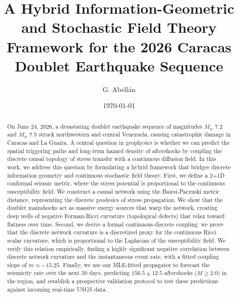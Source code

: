 \documentclass[twocolumn,amsmath,amssymb,aps,pre,superscriptaddress]{revtex4-1}
\begin{document}
\title{A Hybrid Information-Geometric and Stochastic Field Theory Framework for the 2026 Caracas Doublet Earthquake Sequence}

\author{G. Abell\'an}


\date{\today}

\begin{abstract}
On June 24, 2026, a devastating doublet earthquake sequence of magnitudes $M_w$ 7.2 and $M_w$ 7.5 struck northwestern and central Venezuela, causing catastrophic damage in Caracas and La Guaira. A central question in geophysics is whether we can predict the spatial triggering paths and long-term hazard density of aftershocks by coupling the discrete causal topology of stress transfer with a continuous diffusion field. In this work, we address this question by formulating a hybrid framework that bridges discrete information geometry and continuous stochastic field theory. First, we define a 2+1D conformal seismic metric, where the stress potential is proportional to the continuous susceptibility field. We construct a causal network using the Baiesi-Paczuski metric distance, representing the discrete geodesics of stress propagation. We show that the doublet mainshocks act as massive energy sources that warp the network, creating deep wells of negative Forman-Ricci curvature (topological defects) that relax toward flatness over time. Second, we derive a formal continuous-discrete coupling: we prove that the discrete network curvature is a discretized proxy for the continuous Ricci scalar curvature, which is proportional to the Laplacian of the susceptibility field. We verify this relation empirically, finding a highly significant negative correlation between discrete network curvature and the instantaneous event rate, with a fitted coupling slope of $m \approx -15.25$. Finally, we use our MLE-fitted propagator to forecast the seismicity rate over the next 30 days, predicting $156.5 \pm 12.5$ aftershocks ($M \ge 2.0$) in the region, and establish a prospective validation protocol to test these predictions against incoming real-time USGS data.
\end{abstract}

\maketitle
\end{document}
